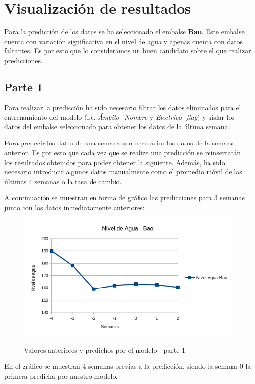 \documentclass[12pt]{report} %
\begin{document}
\chapter{Visualización de resultados}
\label{chap:result-visualizing}

Para la predicción de los datos se ha seleccionado el embalse \textbf{Bao}. Este embalse cuenta con variación significativa en el nivel de agua y apenas cuenta con datos faltantes. Es por esto que lo consideramos un buen candidato sobre el que realizar predicciones.

\section{Parte 1}
Para realizar la predicción ha sido necesario filtrar los datos eliminados para el entrenamiento del modelo (i.e. \textit{Ámbito\_Nombre} y \textit{Electrico\_flag}) y aislar los datos del embalse seleccionado para obtener los datos de la última semana.

Para predecir los datos de una semana son necesarios los datos de la semana anterior. Es por esto que cada vez que se realize una predicción se reinsertarán los resultados obtenidos para poder obtener la siguiente. Además, ha sido necesario introducir algunos datos manualmente como el promedio móvil de las últimas 4 semanas o la tasa de cambio.

A continuación se muestran en forma de gráfico las predicciones para 3 semanas junto con los datos inmediatamente anteriores:

\begin{figure}[H]
    \includegraphics[width=0.85\linewidth]{predict-1-bao.png}\\
    \caption{\small Valores anteriores y  predichos por el modelo - parte 1}
\end{figure}
En el gráfico se muestran 4 semanas previas a la predicción, siendo la semana 0 la primera predicha por nuestro modelo.
\end{document}
